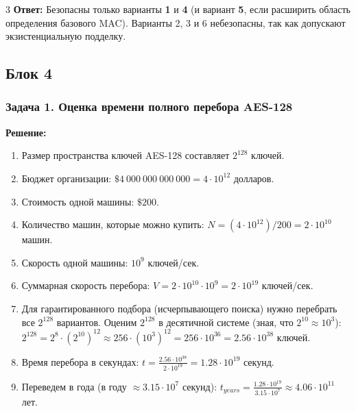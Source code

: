 ﻿\documentclass[9pt,a4paper,landscape]{extarticle}
\newcommand{\tightlist}{}
\begin{document}
\begin{multicols*}{3}
\textbf{Ответ:} Безопасны только варианты \textbf{1} и \textbf{4} (и вариант \textbf{5}, если расширить область определения базового MAC). Варианты 2, 3 и 6 небезопасны, так как допускают экзистенциальную подделку.

\subsection{Блок 4}\label{ux431ux43bux43eux43a-4}

\subsubsection{Задача 1. Оценка времени полного перебора AES-128}\label{ux437ux430ux434ux430ux447ux430-1.-ux43eux446ux435ux43dux43aux430-ux432ux440ux435ux43cux435ux43dux438-ux43fux43eux43bux43dux43eux433ux43e-ux43fux435ux440ux435ux431ux43eux440ux430-aes-128}

\textbf{Решение:}

\begin{enumerate}
\def\labelenumi{\arabic{enumi}.}
\tightlist
\item
  Размер пространства ключей AES-128 составляет \(2^{128}\) ключей.
\item
  Бюджет организации: \(\$4\ 000\ 000\ 000\ 000 = 4 \cdot 10^{12}\) долларов.
\item
  Стоимость одной машины: \(\$200\).
\item
  Количество машин, которые можно купить: \(N = (4 \cdot 10^{12}) / 200 = 2 \cdot 10^{10}\) машин.
\item
  Скорость одной машины: \(10^9\) ключей/сек.
\item
  Суммарная скорость перебора: \(V = 2 \cdot 10^{10} \cdot 10^9 = 2 \cdot 10^{19}\) ключей/сек.
\item
  Для гарантированного подбора (исчерпывающего поиска) нужно перебрать все \(2^{128}\) вариантов. Оценим \(2^{128}\) в десятичной системе (зная, что \(2^{10} \approx 10^3\)): \(2^{128} = 2^8 \cdot (2^{10})^{12} \approx 256 \cdot (10^3)^{12} = 256 \cdot 10^{36} = 2.56 \cdot 10^{38}\) ключей.
\item
  Время перебора в секундах: \(t = \frac{2.56 \cdot 10^{38}}{2 \cdot 10^{19}} = 1.28 \cdot 10^{19}\) секунд.
\item
  Переведем в года (в году \(\approx 3.15 \cdot 10^7\) секунд): \(t_{years} = \frac{1.28 \cdot 10^{19}}{3.15 \cdot 10^7} \approx 4.06 \cdot 10^{11}\) лет.
\end{enumerate}


\end{multicols*}
\end{document}
